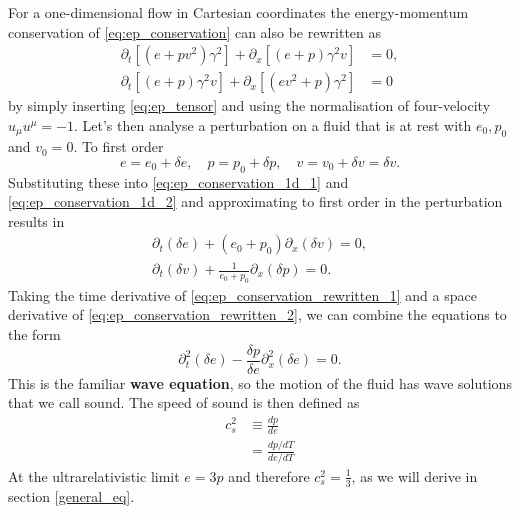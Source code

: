 For a one-dimensional flow in Cartesian coordinates the energy-momentum conservation of \eqref{eq:ep_conservation} can also be rewritten as
\begin{align}
\partial_t \left[ (e+pv^2) \gamma^2 \right] + \partial_x \left[ (e+p) \gamma^2 v \right] &= 0,
\label{eq:ep_conservation_1d_1} \\
\partial_t \left[ (e+p) \gamma^2 v \right] + \partial_x \left[ (ev^2 + p) \gamma^2 \right] &= 0
\label{eq:ep_conservation_1d_2}
\end{align}
by simply inserting \eqref{eq:ep_tensor} and using the normalisation of four-velocity $u_\mu u^\mu = -1$.
Let's then analyse a perturbation on a fluid that is at rest with $e_0, p_0$ and $v_0 = 0$.
To first order
\begin{equation}
e = e_0 + \delta e, \quad p=p_0 + \delta p, \quad v = v_0 + \delta v = \delta v.
\end{equation}
Substituting these into \eqref{eq:ep_conservation_1d_1} and \eqref{eq:ep_conservation_1d_2} and approximating to first order in the perturbation results in
\begin{align}
\partial_t (\delta e) + (e_0 + p_0) \partial_x (\delta v) = 0,
\label{eq:ep_conservation_rewritten_1} \\
\partial_t (\delta v) + \frac{1}{e_0 + p_0} \partial_x (\delta p) = 0.
\label{eq:ep_conservation_rewritten_2}
\end{align}
Taking the time derivative of \eqref{eq:ep_conservation_rewritten_1} and a space derivative of \eqref{eq:ep_conservation_rewritten_2}, we can combine the equations to the form
\begin{equation}
\partial_t^2 (\delta e) - \frac{\delta p}{\delta e} \partial_x^2(\delta e) = 0.
\end{equation}
This is the familiar \textbf{wave equation}, so the motion of the fluid has wave solutions that we call sound.
\cites[ch. 4.3]{rezzolla_relativistic_2013}[ch. 7.4]{lecture_notes}
The speed of sound is then defined as
\cites[eq. 2.168]{rezzolla_relativistic_2013}[eq. 13]{giese_2020}[eq. 3]{giese_2021}
\begin{align}
c_s^2
&\equiv \frac{dp}{de}
\label{eq:cs2_compact} \\
&= \frac{dp/dT}{de/dT}
\label{eq:cs2_explicit}
\end{align}
At the ultrarelativistic limit $e=3p$ and therefore $c_s^2=\frac{1}{3}$, as we will derive in section \ref{general_eq}.

\iffalse
The
\href{https://en.wikipedia.org/wiki/Clausius\%E2\%80\%93Clapeyron_relation}{Clausius-Clapeyron relation} states that
\cite[eq. 5.47, 5.48]{schroeder_thermal_2000}
\begin{equation}
\frac{dp}{dT} = \frac{L}{T \Delta V} = \frac{\Delta S}{\Delta V}.
\end{equation}
\fi

